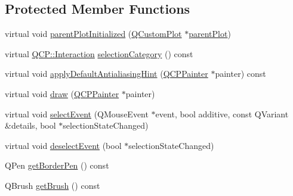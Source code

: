 \subsection*{Protected Member Functions}
\begin{DoxyCompactItemize}
\item 
virtual void \hyperlink{classQCPLegend_a4d552c63d82742d77fb7f177bae7b1ba}{parent\+Plot\+Initialized} (\hyperlink{classQCustomPlot}{Q\+Custom\+Plot} $\ast$\hyperlink{classQCPLayerable_ab7e0e94461566093d36ffc0f5312b109}{parent\+Plot})
\item 
virtual \hyperlink{namespaceQCP_a2ad6bb6281c7c2d593d4277b44c2b037}{Q\+C\+P\+::\+Interaction} \hyperlink{classQCPLegend_a7a9795a28c9c2514b4ae50f0a63d407c}{selection\+Category} () const 
\item 
virtual void \hyperlink{classQCPLegend_a26307f532c3458b379663b7d517a5f47}{apply\+Default\+Antialiasing\+Hint} (\hyperlink{classQCPPainter}{Q\+C\+P\+Painter} $\ast$painter) const 
\item 
virtual void \hyperlink{classQCPLegend_a4462151bf875ca85fa3815457c683fdc}{draw} (\hyperlink{classQCPPainter}{Q\+C\+P\+Painter} $\ast$painter)
\item 
virtual void \hyperlink{classQCPLegend_af93bf87dc5c383a9d2ada80b35f3a1a5}{select\+Event} (Q\+Mouse\+Event $\ast$event, bool additive, const Q\+Variant \&details, bool $\ast$selection\+State\+Changed)
\item 
virtual void \hyperlink{classQCPLegend_a5208ead4331c9b0440f768f059777c58}{deselect\+Event} (bool $\ast$selection\+State\+Changed)
\item 
Q\+Pen \hyperlink{classQCPLegend_a60172c9d2212584f38f5d0c1e50970c7}{get\+Border\+Pen} () const 
\item 
Q\+Brush \hyperlink{classQCPLegend_a236fe4cd617c9f88620fd9de74417f20}{get\+Brush} () const 
\end{DoxyCompactItemize}
